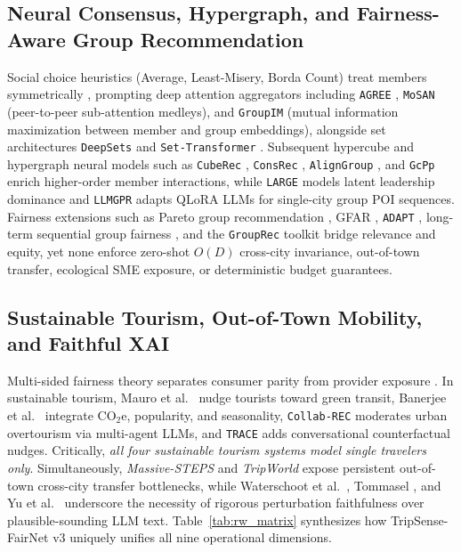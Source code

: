 \documentclass[final,5p,twocolumn]{elsarticle}
\begin{document}
\subsection{Neural Consensus, Hypergraph, and Fairness-Aware Group Recommendation}
Social choice heuristics (Average, Least-Misery, Borda Count) treat members symmetrically \cite{masthoff2015group}, prompting deep attention aggregators including \texttt{AGREE} \cite{cao2018attentive}, \texttt{MoSAN} \cite{tran2019mosan} (peer-to-peer sub-attention medleys), and \texttt{GroupIM} \cite{sankar2020groupim} (mutual information maximization between member and group embeddings), alongside set architectures \texttt{DeepSets} \cite{zaheer2017deepsets} and \texttt{Set-Transformer} \cite{lee2019settransformer}. Subsequent hypercube and hypergraph neural models such as \texttt{CubeRec} \cite{chen2022cuberec}, \texttt{ConsRec} \cite{wu2023consrec}, \texttt{AlignGroup} \cite{xu2024aligngroup}, and \texttt{GcPp} \cite{abolghasemi2024gcpp} enrich higher-order member interactions, while \texttt{LARGE} \cite{gan2024large} models latent leadership dominance and \texttt{LLMGPR} \cite{long2025llmgpr} adapts QLoRA LLMs for single-city group POI sequences. Fairness extensions such as Pareto group recommendation \cite{xiao2017fairness}, GFAR \cite{kaya2020ensuring}, \texttt{ADAPT} \cite{lenzi2025adapt}, long-term sequential group fairness \cite{dokoupil2026longterm}, and the \texttt{GroupRec} toolkit bridge relevance and equity, yet none enforce zero-shot $O(D)$ cross-city invariance, out-of-town transfer, ecological SME exposure, or deterministic budget guarantees.

\subsection{Sustainable Tourism, Out-of-Town Mobility, and Faithful XAI}
Multi-sided fairness theory separates consumer parity from provider exposure \cite{burke2017multisided,patro2020fairrec}. In sustainable tourism, Mauro et al.\ \cite{mauro2024nudging} nudge tourists toward green transit, Banerjee et al.\ \cite{banerjee2025sustainable} integrate $\text{CO}_2\text{e}$, popularity, and seasonality, \texttt{Collab-REC} \cite{banerjee2026collabrec} moderates urban overtourism via multi-agent LLMs, and \texttt{TRACE} \cite{banerjee2026trace} adds conversational counterfactual nudges. Critically, \emph{all four sustainable tourism systems model single travelers only}. Simultaneously, \textit{Massive-STEPS} \cite{wongso2025massivesteps} and \textit{TripWorld} \cite{li2026tripworld} expose persistent out-of-town cross-city transfer bottlenecks, while Waterschoot et al.\ \cite{waterschoot2026consistent}, Tommasel \cite{tommasel2024fairness}, and Yu et al.\ \cite{yu2026finegrained} underscore the necessity of rigorous perturbation faithfulness \cite{deyoung2020eraser,petsiuk2018rise} over plausible-sounding LLM text. Table~\ref{tab:rw_matrix} synthesizes how TripSense-FairNet v3 uniquely unifies all nine operational dimensions.
\end{document}
